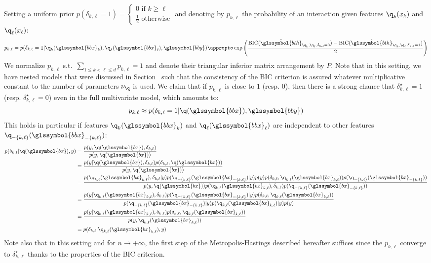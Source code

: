 Setting a uniform prior $p(\delta_{k,\ell}=1) =\begin{cases} 0 \text{ if } k \geq \ell \\ \frac{1}{2} \text{ otherwise} \end{cases}$ and denoting by $p_{k,\ell}$ the probability of an interaction given features $\q_k(x_k)$ and $\q_\ell(x_\ell)$:
\begin{equation} \label{eq:pkl}
p_{k,\ell} = p(\delta_{k,\ell} = 1 | \q_k(\glssymbol{bbx}_k), \q_\ell(\glssymbol{bbx}_\ell), \glssymbol{bby}) \appropto \exp \left( \frac{\text{BIC}(\hat{\glssymbol{bth}}_{\q_k,\q_\ell,\delta_{k,\ell}=0}) - \text{BIC}(\hat{\glssymbol{bth}}_{\q_k,\q_\ell,\delta_{k,\ell}=1})}{2} \right)
\end{equation}
We normalize $p_{k,\ell}$ s.t.\ $\sum_{1 \leq k < \ell \leq d} p_{k,\ell} = 1$ and denote their triangular inferior matrix arrangement by $P$. Note that in this setting, we have nested models that were discussed in Section~ such that the consistency of the BIC criterion is assured whatever multiplicative constant to the number of parameters $\nu_\q$ is used. We claim that if $p_{k,\ell}$ is close to $1$ (resp. $0$), then there is a strong chance that $\delta_{k,\ell}^\star = 1$ (resp. $\delta_{k,\ell}^\star = 0$) even in the full multivariate model, which amounts to:
\[ p_{k,\ell} \approx p(\delta_{k,\ell} = 1 | \q(\glssymbol{bbx}),\glssymbol{bby}) \]
This holds in particular if features $\q_k(\glssymbol{bbx}_k)$ and $\q_\ell(\glssymbol{bbx}_\ell)$ are independent to other features $\q_{-\{k,\ell\}}(\glssymbol{bbx}_{-\{k,\ell\}})$:
\begin{align*}
p(\delta_{k,\ell} | \q(\glssymbol{bx}),y) & = \frac{p(y , \q(\glssymbol{bx}), \delta_{k,\ell})}{p(y , \q(\glssymbol{bx}))} \\
 & = \frac{p(y | \q(\glssymbol{bx}),\delta_{k,\ell}) p(\delta_{k,\ell}, \q(\glssymbol{bx}))}{p(y,\q(\glssymbol{bx}))} \\
 & = \frac{p(\q_{k,\ell}(\glssymbol{bx}_{k,\ell}),\delta_{k,\ell} | y) p(\q_{-\{k,\ell\}}(\glssymbol{bx}_{-\{k,\ell\}}) | y) p(y) p(\delta_{k,\ell},\q_{k,\ell}(\glssymbol{bx}_{k,\ell})) p(\q_{-\{k,\ell\}}(\glssymbol{bx}_{-\{k,\ell\}})) }{p(y,\q(\glssymbol{bx})) p(\q_{k,\ell}(\glssymbol{bx}_{k,\ell}),\delta_{k,\ell}) p(\q_{-\{k,\ell\}}(\glssymbol{bx}_{-\{k,\ell\}}))} \\
 & = \frac{p(y | \q_{k,\ell}(\glssymbol{bx}_{k,\ell}),\delta_{k,\ell}) p(\q_{-\{k,\ell\}}(\glssymbol{bx}_{-\{k,\ell\}}) | y) p(\delta_{k,\ell},\q_{k,\ell}(\glssymbol{bx}_{k,\ell}))}{p(\q_{-\{k,\ell\}}(\glssymbol{bx}_{-\{k,\ell\}}) | y) p(\q_{k,\ell}(\glssymbol{bx}_{k,\ell}) | y) p(y) } \\
 & = \frac{p(y | \q_{k,\ell}(\glssymbol{bx}_{k,\ell}),\delta_{k,\ell}) p(\delta_{k,\ell},\q_{k,\ell}(\glssymbol{bx}_{k,\ell}))}{p(y , \q_{k,\ell}(\glssymbol{bx}_{k,\ell}))} \\
 & = p(\delta_{k,\ell} | \q_{k,\ell}(\glssymbol{bx}_{k,\ell}), y)
\end{align*}
Note also that in this setting and for $n \to +\infty$, the first step of the Metropolis-Hastings described hereafter suffices since the $p_{k,\ell}$ converge to $\delta_{k,\ell}^\star$ thanks to the properties of the BIC criterion.

